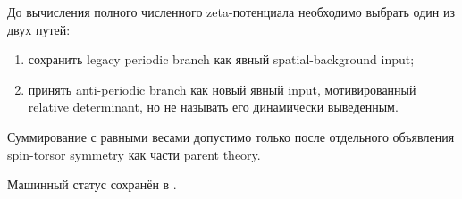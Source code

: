 \begin{protocol}
До вычисления полного численного zeta-потенциала необходимо выбрать один из
двух путей:
\begin{enumerate}
 \item сохранить legacy periodic branch как явный spatial-background input;
 \item принять anti-periodic branch как новый явный input, мотивированный
 relative determinant, но не называть его динамически выведенным.
\end{enumerate}
Суммирование с равными весами допустимо только после отдельного объявления
spin-torsor symmetry как части parent theory.
\end{protocol}

Машинный статус сохранён в
.